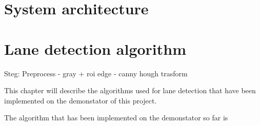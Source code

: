 \section{System architecture}


\section{Lane detection algorithm}


Steg: Preprocess - gray + roi
edge - canny
hough trasform


This chapter will describe the algorithms used for lane detection that have been implemented on the demonstator of this project. 

The algorithm that has been implemented on the demonstator so far is 


